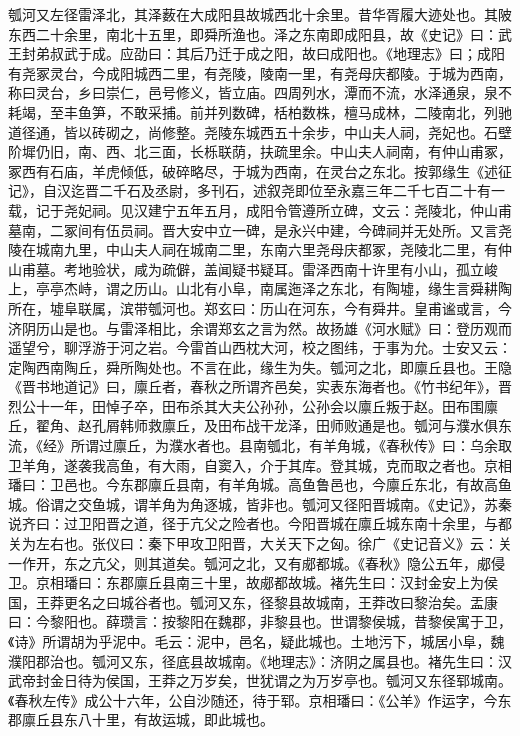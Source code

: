 \documentclass[12pt,UTF8]{ctexbook}
\begin{document}
瓠河又左径雷泽北，其泽薮在大成阳县故城西北十余里。昔华胥履大迹处也。其陂东西二十余里，南北十五里，即舜所渔也。泽之东南即成阳县，故《史记》曰：武王封弟叔武于成。应劭曰：其后乃迁于成之阳，故曰成阳也。《地理志》曰；成阳有尧冢灵台，今成阳城西二里，有尧陵，陵南一里，有尧母庆都陵。于城为西南，称曰灵台，乡曰崇仁，邑号修义，皆立庙。四周列水，潭而不流，水泽通泉，泉不耗竭，至丰鱼笋，不敢采捕。前并列数碑，栝柏数株，檀马成林，二陵南北，列驰道径通，皆以砖砌之，尚修整。尧陵东城西五十余步，中山夫人祠，尧妃也。石壁阶墀仍旧，南、西、北三面，长栎联荫，扶疏里余。中山夫人祠南，有仲山甫冢，冢西有石庙，羊虎倾低，破碎略尽，于城为西南，在灵台之东北。按郭缘生《述征记》，自汉迄晋二千石及丞尉，多刊石，述叙尧即位至永嘉三年二千七百二十有一载，记于尧妃祠。见汉建宁五年五月，成阳令管遵所立碑，文云：尧陵北，仲山甫墓南，二冢间有伍员祠。晋大安中立一碑，是永兴中建，今碑祠并无处所。又言尧陵在城南九里，中山夫人祠在城南二里，东南六里尧母庆都冢，尧陵北二里，有仲山甫墓。考地验状，咸为疏僻，盖闻疑书疑耳。雷泽西南十许里有小山，孤立峻上，亭亭杰峙，谓之历山。山北有小阜，南属迤泽之东北，有陶墟，缘生言舜耕陶所在，墟阜联属，滨带瓠河也。郑玄曰：历山在河东，今有舜井。皇甫谧或言，今济阴历山是也。与雷泽相比，余谓郑玄之言为然。故扬雄《河水赋》曰：登历观而遥望兮，聊浮游于河之岩。今雷首山西枕大河，校之图纬，于事为允。士安又云：定陶西南陶丘，舜所陶处也。不言在此，缘生为失。瓠河之北，即廪丘县也。王隐《晋书地道记》曰，廪丘者，春秋之所谓齐邑矣，实表东海者也。《竹书纪年》，晋烈公十一年，田悼子卒，田布杀其大夫公孙孙，公孙会以廪丘叛于赵。田布围廪丘，翟角、赵孔屑韩师救廪丘，及田布战干龙泽，田师败通是也。瓠河与濮水俱东流，《经》所谓过廪丘，为濮水者也。县南瓠北，有羊角城，《春秋传》曰：乌余取卫羊角，遂袭我高鱼，有大雨，自窦入，介于其库。登其城，克而取之者也。京相璠曰：卫邑也。今东郡廪丘县南，有羊角城。高鱼鲁邑也，今廪丘东北，有故高鱼城。俗谓之交鱼城，谓羊角为角逐城，皆非也。瓠河又径阳晋城南。《史记》，苏秦说齐曰：过卫阳晋之道，径于亢父之险者也。今阳晋城在廪丘城东南十余里，与都关为左右也。张仪曰：秦下甲攻卫阳晋，大关天下之匈。徐广《史记音义》云：关一作开，东之亢父，则其道矣。瓠河之北，又有郕都城。《春秋》隐公五年，郕侵卫。京相璠曰：东郡廪丘县南三十里，故郕都故城。褚先生曰：汉封金安上为侯国，王莽更名之曰城谷者也。瓠河又东，径黎县故城南，王莽改曰黎治矣。盂康曰：今黎阳也。薛瓒言：按黎阳在魏郡，非黎县也。世谓黎侯城，昔黎侯寓于卫，《诗》所谓胡为乎泥中。毛云：泥中，邑名，疑此城也。土地污下，城居小阜，魏濮阳郡治也。瓠河又东，径底县故城南。《地理志》：济阴之属县也。褚先生曰：汉武帝封金日待为侯国，王莽之万岁矣，世犹谓之为万岁亭也。瓠河又东径郓城南。《春秋左传》成公十六年，公自沙随还，待于郓。京相璠曰：《公羊》作运字，今东郡廪丘县东八十里，有故运城，即此城也。
\end{document}
